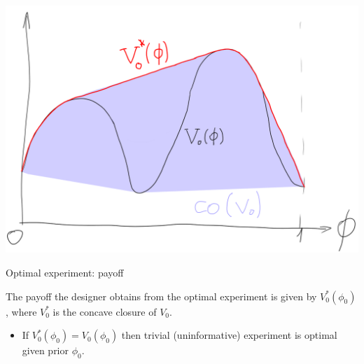 \documentclass[english,10pt
,aspectratio=169
]{beamer}
\begin{document}
\begin{frame}
	\centering
	\includegraphics[scale=0.3]{pics/M7/concav3.png}
\end{frame}


\begin{frame}{Optimal experiment: payoff}
\begin{theorem}
	The payoff the designer obtains from the optimal experiment is given by $V_0^*(\phi_0)$, where $V_0^*$ is the concave closure of $V_0$.
\end{theorem}
\begin{itemize}
	\item If $V_0^*(\phi_0) = V_0(\phi_0)$ then trivial (uninformative) experiment is optimal given prior $\phi_0$.
\end{itemize}
\end{frame}
\end{document}
